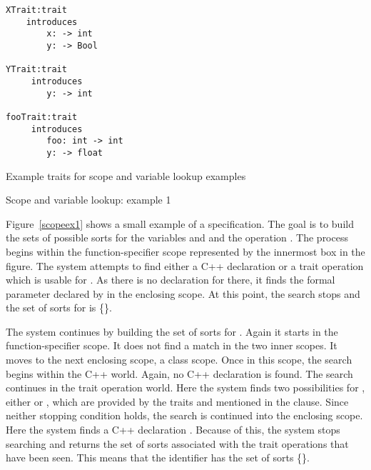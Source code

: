 \begin{BFIGURE}
\begin{verbatim}
XTrait:trait
    introduces 
        x: -> int
        y: -> Bool

YTrait:trait
     introduces 
        y: -> int

fooTrait:trait
     introduces
        foo: int -> int
        y: -> float
\end{verbatim}
\caption{Example traits for scope and variable lookup examples}
\label{scopetraits}
\end{BFIGURE}

\begin{BFIGURE}
\begin{center}

\end{center}
\caption{Scope and variable lookup: example 1}
\label{scopeex1}
\end{BFIGURE}
Figure~\ref{scopeex1} shows a small example of a specification. The
goal is to build the sets of possible sorts for the variables
 and  and the operation \reserved{+}. The
process begins within the function-specifier scope represented by the
innermost box in the figure. The system attempts to find either a C++
declaration or a trait operation which is usable for . As
there is no declaration for  there, it finds the formal
parameter declared by  in the enclosing scope. At this
point, the search stops and the set of sorts for  is
\{\}.

The system continues by building the set of sorts for
. Again it starts in the function-specifier scope. It does
not find a match in the two inner scopes. It moves to the next
enclosing scope, a class scope. Once in this scope, the search begins
within the C++ world. Again, no C++ declaration is found. The search
continues in the trait operation world. Here the system finds two
possibilities for , either  or , which are provided by the traits  and 
mentioned in the
 clause. Since neither stopping condition holds, the search is continued into the enclosing scope. Here the
system finds a C++ declaration . Because of this, the
system stops searching and returns the set of sorts associated with the trait
operations that have been seen. 
This means that the
identifier
 has the set of sorts \{\}. 


